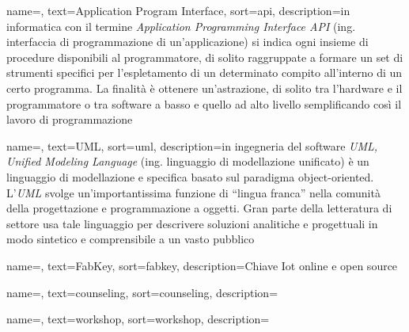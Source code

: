 
\renewcommand{\acronymname}{Acronimi e abbreviazioni}



\renewcommand{\glossaryname}{Glossario}

{
    name=,
    text=Application Program Interface,
    sort=api,
    description={in informatica con il termine \emph{Application Programming Interface API} (ing. interfaccia di programmazione di un'applicazione) si indica ogni insieme di procedure disponibili al programmatore, di solito raggruppate a formare un set di strumenti specifici per l'espletamento di un determinato compito all'interno di un certo programma. La finalità è ottenere un'astrazione, di solito tra l'hardware e il programmatore o tra software a basso e quello ad alto livello semplificando così il lavoro di programmazione}
}

{
    name=,
    text=UML,
    sort=uml,
    description={in ingegneria del software \emph{UML, Unified Modeling Language} (ing. linguaggio di modellazione unificato) è un linguaggio di modellazione e specifica basato sul paradigma object-oriented. L'\emph{UML} svolge un'importantissima funzione di ``lingua franca'' nella comunità della progettazione e programmazione a oggetti. Gran parte della letteratura di settore usa tale linguaggio per descrivere soluzioni analitiche e progettuali in modo sintetico e comprensibile a un vasto pubblico}
}

{
    name=,
    text=FabKey,
    sort=fabkey,
    description={Chiave Iot online e open source}
}

{
	name=,
    text=counseling,
    sort=counseling,
    description={}
}

{
	name=,
    text=workshop,
    sort=workshop,
    description={}
}

